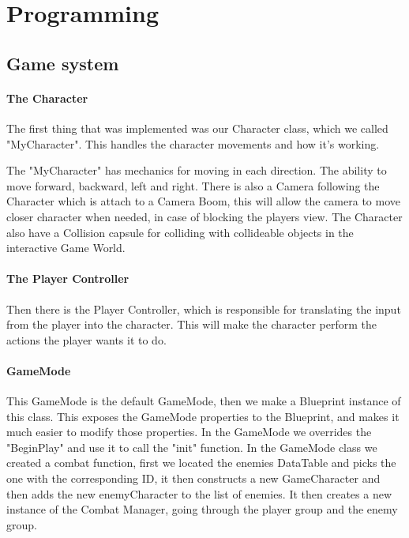 \chapter{Programming}
\label{ch:kap5}

\section{Game system}
\label{sec:Gamesystem}

\subsubsection{The Character}
The first thing that was implemented was our Character class, which we called "MyCharacter". This handles the character movements and  how it's working. 

The "MyCharacter" has mechanics for moving in each direction. The ability to move forward, backward, left and right. There is also a Camera following the Character which is attach to a Camera Boom, this will allow the camera to move closer character when needed, in case of blocking the players view. The Character also have a Collision capsule for colliding with collideable objects in the interactive Game World.  

\subsubsection{The Player Controller}
Then there is the Player Controller, which is responsible for translating the input from the player into the character. This will make the character perform the actions the player wants it to do.

\subsubsection{GameMode} 
This GameMode is the default GameMode, then we make a Blueprint instance of this class. This exposes the GameMode properties to the Blueprint, and makes it much easier to modify those properties. In the GameMode we overrides the "BeginPlay" and use it to call the "init" function. In the GameMode class we created a combat function, first we located the enemies DataTable and picks the one with the corresponding ID, it then constructs a new GameCharacter and then adds the new enemyCharacter to the list of enemies. It then creates a new instance of the Combat Manager, going through the player group and the enemy group.

